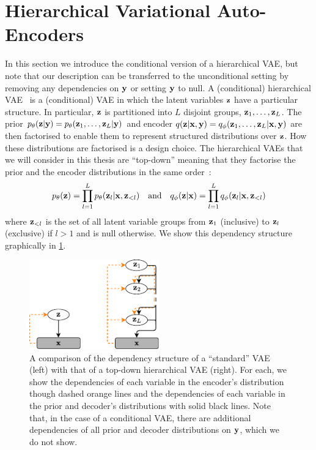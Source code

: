 \section{Hierarchical Variational Auto-Encoders} \label{sec:hierarchical-vae}
In this section we introduce the conditional version of a hierarchical VAE, but note that our description can be transferred to the unconditional setting by removing any dependencies on ${\mathbf{y}}$ or setting ${\mathbf{y}}$ to null. A (conditional) hierarchical VAE~\citep{gregor2015draw,kingma2016improving,sonderby2016ladder,klushyn2019learning} is a (conditional) VAE in which the latent variables ${\mathbf{z}}$ have a particular structure. In particular, ${\mathbf{z}}$ is partitioned into $L$ disjoint groups, ${\mathbf{z}}_1,\ldots,{\mathbf{z}}_L$. The prior $p_\theta({\mathbf{z}}|{\mathbf{y}}) = p_\theta({\mathbf{z}}_1,\ldots,{\mathbf{z}}_L|{\mathbf{y}})$ and encoder $q({\mathbf{z}}|{\mathbf{x}},{\mathbf{y}}) = q_\phi({\mathbf{z}}_1,\ldots,{\mathbf{z}}_L|{\mathbf{x}},{\mathbf{y}})$ are then factorised to enable them to represent structured distributions over ${\mathbf{z}}$. How these distributions are factorised is a design choice.
The hierarchical VAEs that we will consider in this thesis are ``top-down'' meaning that they factorise the prior and the encoder distributions in the same order~\citep{vahdat2020nvae,child2020very}:
\begin{equation}
    p_\theta({\mathbf{z}}) = \prod_{l=1}^L p_\theta({\mathbf{z}}_l|{\mathbf{x}},{\mathbf{z}}_{<l}) \quad \text{and} \quad q_\phi({\mathbf{z}}|{\mathbf{x}}) = \prod_{l=1}^L q_\phi({\mathbf{z}}_l|{\mathbf{x}},{\mathbf{z}}_{<l})
\end{equation}
where ${\mathbf{z}}_{<l}$ is the set of all latent variable groups from ${\mathbf{z}}_1$ (inclusive) to ${\mathbf{z}}_{l}$ (exclusive) if $l > 1$ and is null otherwise. We show this dependency structure graphically in \cref{fig:vae-vs-hierarchical-vae}.

\begin{figure}
    \centering
    \includegraphics[width=0.5\textwidth]{figs/vae-vs-hierarchical-vae.pdf}
    \caption{A comparison of the dependency structure of a ``standard'' VAE (left) with that of a top-down hierarchical VAE (right). For each, we show the dependencies of each variable in the encoder's distribution though dashed orange lines and the dependencies of each variable in the prior and decoder's distributions with solid black lines. Note that, in the case of a conditional VAE, there are additional dependencies of all prior and decoder distributions on ${\mathbf{y}}$, which we do not show.}
    \label{fig:vae-vs-hierarchical-vae}
\end{figure}

